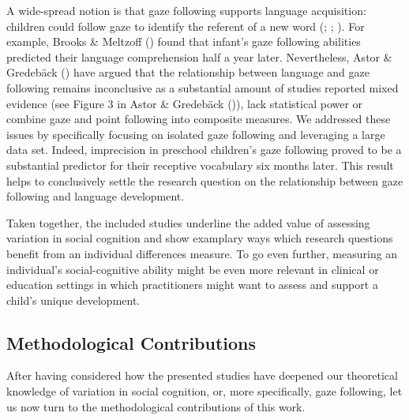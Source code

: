 \documentclass[
]{scrbook}
\begin{document}
A wide-spread notion is that gaze following supports language acquisition: children could follow gaze to identify the referent of a new word (; ; ). For example, Brooks \& Meltzoff () found that infant's gaze following abilities predicted their language comprehension half a year later. Nevertheless, Astor \& Gredebäck () have argued that the relationship between language and gaze following remains inconclusive as a substantial amount of studies reported mixed evidence (see Figure 3 in Astor \& Gredebäck ()), lack statistical power or combine gaze and point following into composite measures. We addressed these issues by specifically focusing on isolated gaze following and leveraging a large data set. Indeed, imprecision in preschool children's gaze following proved to be a substantial predictor for their receptive vocabulary six months later. This result helps to conclusively settle the research question on the relationship between gaze following and language development.

Taken together, the included studies underline the added value of assessing variation in social cognition and show examplary ways which research questions benefit from an individual differences measure. To go even further, measuring an individual's social-cognitive ability might be even more relevant in clinical or education settings in which practitioners might want to assess and support a child's unique development.

\subsection{Methodological Contributions}\label{methodological-contributions}

After having considered how the presented studies have deepened our theoretical knowledge of variation in social cognition, or, more specifically, gaze following, let us now turn to the methodological contributions of this work.
\end{document}
